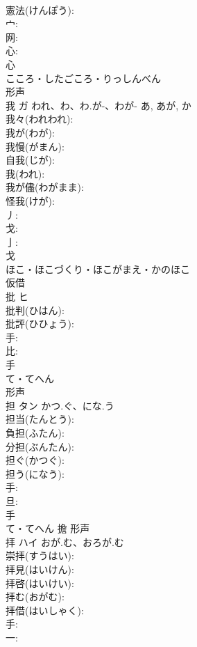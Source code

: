 \documentclass[8pt]{extreport}
\begin{document}
\begin{CJK}{UTF8}{min}
\\	憲法(けんぽう): 
\\	宀: 
\\	网: 
\\	心: 
\\	心	
\\	こころ・したごころ・りっしんべん	
\\	形声 
\\	我	ガ	われ、わ、わ.が-、わが-	あ, あが, か	
\\	我々(われわれ): 
\\	我が(わが): 
\\	我慢(がまん): 
\\	自我(じが): 
\\	我(われ): 
\\	我が儘(わがまま): 
\\	怪我(けが): 
\\	丿: 
\\	戈: 
\\	亅: 
\\	戈	
\\	ほこ・ほこづくり・ほこがまえ・かのほこ	
\\	仮借 
\\	批	ヒ			
\\	批判(ひはん): 
\\	批評(ひひょう): 
\\	手: 
\\	比: 
\\	手	
\\	て・てへん	
\\	形声 
\\	担	タン	かつ.ぐ、にな.う		
\\	担当(たんとう): 
\\	負担(ふたん): 
\\	分担(ぶんたん): 
\\	担ぐ(かつぐ): 
\\	担う(になう): 
\\	手: 
\\	旦: 
\\	手	
\\	て・てへん	擔	形声 
\\	拝	ハイ	おが.む、おろが.む		
\\	崇拝(すうはい): 
\\	拝見(はいけん): 
\\	拝啓(はいけい): 
\\	拝む(おがむ): 
\\	拝借(はいしゃく): 
\\	手: 
\\	一: 

\end{CJK}
\end{document}
